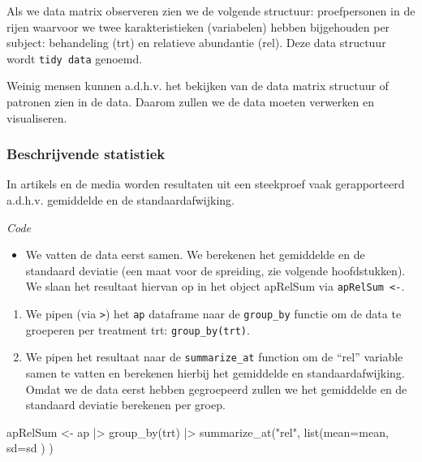 \documentclass[
  dutch,
  letterpaper,
  12pt]{book}
\newenvironment{Shaded}{\begin{snugshade}}{\end{snugshade}}
\newcommand{\AttributeTok}[1]{\textcolor[rgb]{0.40,0.45,0.13}{#1}}
\newcommand{\FunctionTok}[1]{\textcolor[rgb]{0.28,0.35,0.67}{#1}}
\newcommand{\NormalTok}[1]{\textcolor[rgb]{0.00,0.23,0.31}{#1}}
\newcommand{\OtherTok}[1]{\textcolor[rgb]{0.00,0.23,0.31}{#1}}
\newcommand{\SpecialCharTok}[1]{\textcolor[rgb]{0.37,0.37,0.37}{#1}}
\newcommand{\StringTok}[1]{\textcolor[rgb]{0.13,0.47,0.30}{#1}}
\providecommand{\tightlist}{%
  \setlength{\itemsep}{0pt}\setlength{\parskip}{0pt}}
\theoremstyle{definition}
\theoremstyle{definition}
\theoremstyle{definition}
\theoremstyle{remark}
\begin{document}
Als we data matrix observeren zien we de volgende structuur:
proefpersonen in de rijen waarvoor we twee karakteristieken (variabelen)
hebben bijgehouden per subject: behandeling (trt) en relatieve
abundantie (rel). Deze data structuur wordt \texttt{tidy\ data} genoemd.

Weinig mensen kunnen a.d.h.v. het bekijken van de data matrix structuur
of patronen zien in de data. Daarom zullen we de data moeten verwerken
en visualiseren.

\subsubsection{Beschrijvende statistiek}\label{beschrijvende-statistiek}

In artikels en de media worden resultaten uit een steekproef vaak
gerapporteerd a.d.h.v. gemiddelde en de standaardafwijking.

\emph{Code}

\begin{itemize}
\tightlist
\item
  We vatten de data eerst samen. We berekenen het gemiddelde en de
  standaard deviatie (een maat voor de spreiding, zie volgende
  hoofdstukken). We slaan het resultaat hiervan op in het object
  apRelSum via \texttt{apRelSum\ \textless{}-}.
\end{itemize}

\begin{enumerate}
\def\labelenumi{\arabic{enumi}.}
\item
  We pipen (via \texttt{\textbar{}\textgreater{}}) het \texttt{ap}
  dataframe naar de \texttt{group\_by} functie om de data te groeperen
  per treatment trt: \texttt{group\_by(trt)}.
\item
  We pipen het resultaat naar de \texttt{summarize\_at} function om de
  ``rel'' variable samen te vatten en berekenen hierbij het gemiddelde
  en standaardafwijking. Omdat we de data eerst hebben gegroepeerd
  zullen we het gemiddelde en de standaard deviatie berekenen per groep.
\end{enumerate}

\begin{Shaded}
\begin{Highlighting}[]
\NormalTok{apRelSum }\OtherTok{\textless{}{-}}\NormalTok{ ap }\SpecialCharTok{|\textgreater{}}
  \FunctionTok{group\_by}\NormalTok{(trt) }\SpecialCharTok{|\textgreater{}}
  \FunctionTok{summarize\_at}\NormalTok{(}\StringTok{"rel"}\NormalTok{,}
               \FunctionTok{list}\NormalTok{(}\AttributeTok{mean=}\NormalTok{mean,}
                    \AttributeTok{sd=}\NormalTok{sd}
\NormalTok{                    )}
\NormalTok{                )}
\end{Highlighting}
\end{Shaded}
\end{document}
